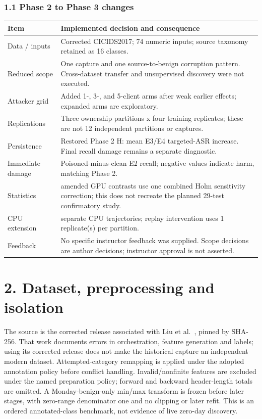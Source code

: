 \documentclass[
  10pt,
  a4paper,
]{article}
\begin{document}
\hypertarget{phase-2-to-phase-3-changes}{%
\subsubsection{1.1 Phase 2 to Phase 3
changes}\label{phase-2-to-phase-3-changes}}

\begin{longtable}[]{@{}
  >{\raggedright\arraybackslash}p{}
  >{\raggedright\arraybackslash}p{}@{}}
\toprule
Item & Implemented decision and consequence \\
\midrule
\endhead
Data / inputs & Corrected CICIDS2017; 74 numeric inputs; source taxonomy
retained as 16 classes. \\
Reduced scope & One capture and one source-to-benign corruption pattern.
Cross-dataset transfer and unsupervised discovery were not executed. \\
Attacker grid & Added 1-, 3-, and 5-client arms after weak earlier
effects; expanded arms are exploratory. \\
Replications & Three ownership partitions x four training replicates;
these are not 12 independent partitions or captures. \\
Persistence & Restored Phase 2 H: mean E3/E4 targeted-ASR increase.
Final recall damage remains a separate diagnostic. \\
Immediate damage & Poisoned-minus-clean E2 recall; negative values
indicate harm, matching Phase 2. \\
Statistics & 47 amended GPU contrasts use one combined Holm sensitivity
correction; this does not recreate the planned 29-test confirmatory
study. \\
CPU extension & 21 separate CPU trajectories; replay intervention uses 1
replicate(s) per partition. \\
Feedback & No specific instructor feedback was supplied. Scope decisions
are author decisions; instructor approval is not asserted. \\
\bottomrule
\end{longtable}

\hypertarget{dataset-preprocessing-and-isolation}{%
\section{2. Dataset, preprocessing and
isolation}\label{dataset-preprocessing-and-isolation}}

The source is the corrected release associated with Liu et al.~\cite{liu},
pinned by SHA-256. That work documents errors in orchestration, feature
generation and labels; using its corrected release does not make the
historical capture an independent modern dataset. Attempted-category
remapping is applied under the adopted annotation policy before conflict
handling. Invalid/nonfinite features are excluded under the named
preparation policy; forward and backward header-length totals are
omitted. A Monday-benign-only min/max transform is frozen before later
stages, with zero-range denominator one and no clipping or later refit.
This is an ordered annotated-class benchmark, not evidence of live
zero-day discovery.
\end{document}
